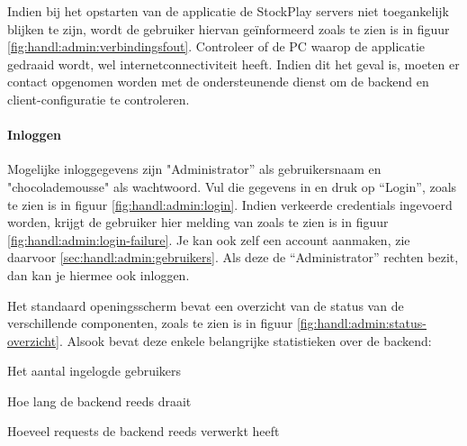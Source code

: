 Indien bij het opstarten van de applicatie de StockPlay servers niet toegankelijk blijken te zijn, wordt de gebruiker hiervan ge\"informeerd zoals te zien is in figuur \ref{fig:handl:admin:verbindingsfout}. Controleer of de PC waarop de applicatie gedraaid wordt, wel internetconnectiviteit heeft. Indien dit het geval is, moeten er contact opgenomen worden met de ondersteunende dienst om de backend en client-configuratie te controleren.

\paragraph{Inloggen}

Mogelijke inloggegevens zijn "Administrator'' als gebruikersnaam en "chocolademousse" als wachtwoord. Vul die gegevens in en druk op ``Login'', zoals te zien is in figuur \ref{fig:handl:admin:login}. Indien verkeerde credentials ingevoerd worden, krijgt de gebruiker hier melding van zoals te zien is in figuur \ref{fig:handl:admin:login-failure}.
Je kan ook zelf een account aanmaken, zie daarvoor \ref{sec:handl:admin:gebruikers}. Als deze de ``Administrator'' rechten bezit, dan kan je hiermee ook inloggen.

\begin{figure}
	\centering
\end{figure}

Het standaard openingsscherm bevat een overzicht van de status van de verschillende componenten, zoals te zien is in figuur \ref{fig:handl:admin:status-overzicht}.
Alsook bevat deze enkele belangrijke statistieken over de backend:
\begin{enumerate_compact}
\item Het aantal ingelogde gebruikers
\item Hoe lang de backend reeds draait
\item Hoeveel requests de backend reeds verwerkt heeft
\end{enumerate_compact}

